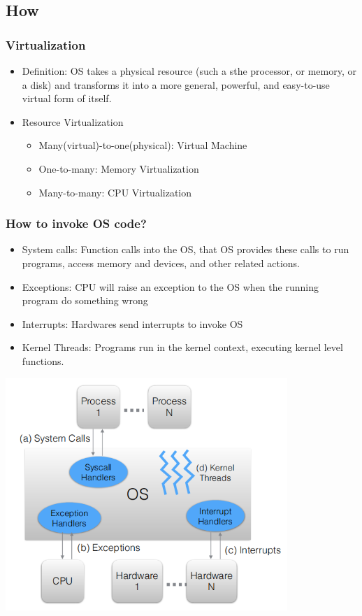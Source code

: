 \documentclass[12pt]{article}
\begin{document}
\subsection{How}
\subsubsection{Virtualization}
\begin{itemize}
    \item Definition: OS takes a physical resource (such a sthe processor, or memory, or a disk) and transforms it into a more general, powerful, and easy-to-use virtual form of itself.
    \item Resource Virtualization \begin{itemize}
        \item Many(virtual)-to-one(physical): Virtual Machine
        \item One-to-many: Memory Virtualization
        \item Many-to-many: CPU Virtualization
    \end{itemize}
\end{itemize}
\subsubsection{How to invoke OS code?}
\begin{itemize}
    \item System calls: Function calls into the OS, that OS provides these calls to run programs, access memory and devices, and other related actions.
    \item Exceptions: CPU will raise an exception to the OS when the running program do something wrong
    \item Interrupts: Hardwares send interrupts to invoke OS
    \item Kernel Threads: Programs run in the kernel context, executing kernel level functions.
\end{itemize}
\includegraphics[width=0.8\textwidth]{FourWaysToInvokeOS.png}
\end{document}
